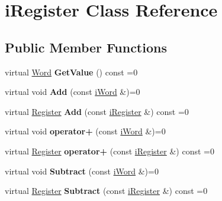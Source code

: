 \hypertarget{classiRegister}{
\section{iRegister Class Reference}
\label{classiRegister}
}
\subsection*{Public Member Functions}
\begin{DoxyCompactItemize}
\item 
\hypertarget{classiRegister_ae7266f6f981b621f53f3c7cf77d4966a}{
virtual \hyperlink{classWord}{Word} {\bfseries GetValue} () const =0}
\label{classiRegister_ae7266f6f981b621f53f3c7cf77d4966a}

\item 
\hypertarget{classiRegister_a04c04487fb26b63dfd02ac46f30836a5}{
virtual void {\bfseries Add} (const \hyperlink{classiWord}{iWord} \&)=0}
\label{classiRegister_a04c04487fb26b63dfd02ac46f30836a5}

\item 
\hypertarget{classiRegister_aa24da0ef051cb2c8bae6d8ada2cfbd36}{
virtual \hyperlink{classRegister}{Register} {\bfseries Add} (const \hyperlink{classiRegister}{iRegister} \&) const =0}
\label{classiRegister_aa24da0ef051cb2c8bae6d8ada2cfbd36}

\item 
\hypertarget{classiRegister_afda32a5787c078c01a80714e036a7aad}{
virtual void {\bfseries operator+} (const \hyperlink{classiWord}{iWord} \&)=0}
\label{classiRegister_afda32a5787c078c01a80714e036a7aad}

\item 
\hypertarget{classiRegister_a36266f3005cfab5e84a96478936c89d1}{
virtual \hyperlink{classRegister}{Register} {\bfseries operator+} (const \hyperlink{classiRegister}{iRegister} \&) const =0}
\label{classiRegister_a36266f3005cfab5e84a96478936c89d1}

\item 
\hypertarget{classiRegister_a86ebf3b7956c53dbaf4ead536c329290}{
virtual void {\bfseries Subtract} (const \hyperlink{classiWord}{iWord} \&)=0}
\label{classiRegister_a86ebf3b7956c53dbaf4ead536c329290}

\item 
\hypertarget{classiRegister_addc903e18199f457ed4f0a3f314d3039}{
virtual \hyperlink{classRegister}{Register} {\bfseries Subtract} (const \hyperlink{classiRegister}{iRegister} \&) const =0}
\label{classiRegister_addc903e18199f457ed4f0a3f314d3039}


\end{DoxyCompactItemize}
